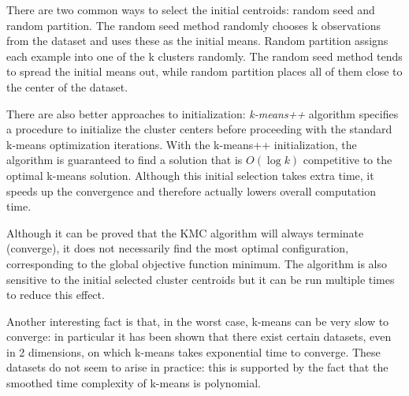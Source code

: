\documentclass[conference]{IEEEtran}
\begin{document}

There are two common ways to select the initial centroids: random seed and random partition.
The random seed method randomly chooses k observations from the dataset
and uses these as the initial means. Random partition
assigns each example into one of the k clusters randomly.
The random seed method tends to spread the initial means out, while random partition
places all of them close to the center of the dataset.

There are also better approaches to initialization: \textit{k-means++} algorithm specifies a
procedure to initialize the cluster centers before proceeding with the standard k-means
optimization iterations. With the k-means++ initialization, the algorithm is guaranteed
to find a solution that is $O(\log k)$ competitive to the optimal k-means solution.
Although this initial selection takes extra time, it speeds up the convergence and 
therefore actually lowers overall computation time.

Although it can be proved that the KMC algorithm will always terminate (converge),
it does not necessarily find the most optimal configuration,
corresponding to the global objective function minimum. The algorithm is also sensitive
to the initial selected cluster centroids but it can be run multiple times to reduce this effect.

Another interesting fact is that, in the worst case, k-means can be very slow to converge:
in particular it has been shown that there exist certain datasets,
even in 2 dimensions, on which k-means takes exponential time to converge.
These datasets do not seem to arise in practice: this is supported by the
fact that the smoothed time complexity of k-means is polynomial.

\end{document}
